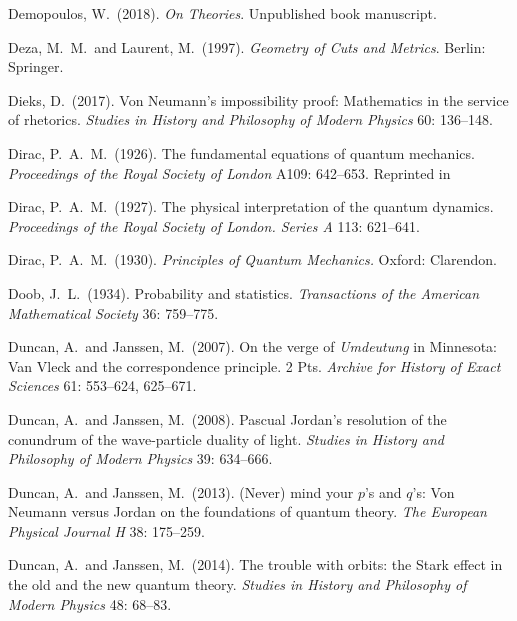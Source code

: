 \documentclass[12pt]{article}
\numberwithin{equation}{section}
\begin{document}
\begin{thebibliography}{}
 Demopoulos, W.\ (2018). \emph{On Theories}. Unpublished book manuscript.

 Deza, M.\ M.\ and Laurent, M.\  (1997). \emph{Geometry of Cuts and Metrics}. Berlin: Springer.

 Dieks, D.\ (2017). Von Neumann's impossibility proof: Mathematics in the service of rhetorics. \emph{Studies in History and Philosophy of Modern Physics} 60: 136--148.

 Dirac, P.\ A.\ M.\ (1926). The fundamental equations of quantum mechanics. \emph{Proceedings of the Royal Society of London} A109: 642--653. Reprinted in \citet[pp.\ 307--320]{Van der Waerden}

 Dirac, P.\ A.\ M.\  (1927).  The physical interpretation of the quantum dynamics. \emph{Proceedings of the Royal Society of London. Series A} 113: 621--641. 

 Dirac, P.\ A.\ M.\  (1930). \emph{Principles of Quantum Mechanics.} Oxford: Clarendon.

 Doob, J.\ L.\ (1934). Probability and statistics. \emph{Transactions of the American Mathematical Society} 36: 759--775.

 Duncan, A.\ and Janssen, M.\  (2007). On the verge of \emph{Umdeutung} in Minnesota: Van Vleck and the correspondence principle. 2 Pts. \emph{Archive for History of Exact Sciences} 61: 553--624, 625--671.

 Duncan, A.\ and Janssen, M.\   (2008). Pascual Jordan's resolution of the conundrum of the wave-particle duality of light. \emph{Studies in History and Philosophy of Modern Physics} 39: 634--666.

 Duncan, A.\ and Janssen, M.\  (2013). (Never) mind your $p$'s and $q$'s: Von Neumann versus Jordan on the foundations of quantum theory. \emph{The European Physical Journal H} 38: 175--259.

 Duncan, A.\ and Janssen, M.\  (2014). The trouble with orbits: the Stark effect in the old and the new quantum theory. \emph{Studies in History and Philosophy of Modern Physics} 48: 68--83.


\end{thebibliography}
\end{document}
